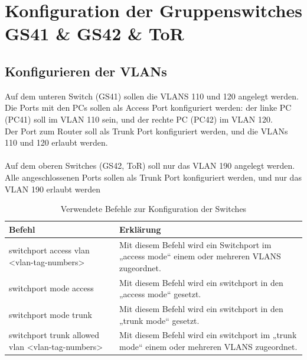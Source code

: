 \documentclass{article}
\begin{document}
\pagebreak



\section{Konfiguration der Gruppenswitches GS41 \& GS42 \& ToR}

\subsection{Konfigurieren der VLANs}

Auf dem unteren Switch (GS41) sollen die VLANS 110 und 120 angelegt werden.\\
Die Ports mit den PCs sollen als Access Port konfiguriert werden: der linke PC (PC41) soll im VLAN 110 sein, und der rechte PC (PC42) im VLAN 120.\\
Der Port zum Router soll als Trunk Port konfiguriert werden, und die VLANs 110 und 120 erlaubt werden. \\
\\
Auf dem oberen Switches (GS42, ToR) soll nur das VLAN 190 angelegt werden.\\
Alle angeschlossenen Ports sollen als Trunk Port konfiguriert werden, und nur das VLAN 190 erlaubt werden\\

\begin{table}[htbp]
    \centering
    \begin{tabularx}{\textwidth}{|X|X|}
        \toprule
        \textbf{Befehl} & \textbf{Erklärung} \\
        \midrule
        switchport access vlan <vlan-tag-numbers> & Mit diesem Befehl wird ein Switchport im „access mode“ einem oder mehreren VLANS zugeordnet.\\
        \hline
        switchport mode access & Mit diesem Befehl wird ein switchport in den „access mode“ gesetzt.\\
        \hline
        switchport mode trunk & Mit diesem Befehl wird ein switchport in den „trunk mode“ gesetzt.\\
        \hline
         switchport trunk allowed vlan <vlan-tag-numbers> & Mit diesem Befehl wird ein switchport im „trunk mode“ einem oder mehreren VLANS zugeordnet.\\
        \bottomrule
    \end{tabularx}
    \caption{Verwendete Befehle zur Konfiguration der Switches}
\end{table}
\end{document}
